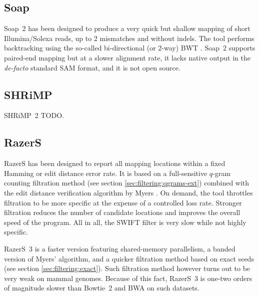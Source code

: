 
\subsection{Soap}
\label{background:mappers:soap}

Soap~2 \citep{Li2009b} has been designed to produce a very quick but shallow mapping of short Illumina/Solexa reads, up to 2 mismatches and without indels.
The tool performs backtracking using the so-called bi-directional (or 2-way) BWT \citep{Belazzougui2013}.
Soap~2 supports paired-end mapping but at a slower alignment rate, it lacks native output in the \emph{de-facto} standard SAM format, and it is not open source.


\subsection{SHRiMP}
\label{background:mappers:shrimp}

SHRiMP~2 TODO.


\subsection{RazerS}
\label{background:mappers:razers}

RazerS \citep{Weese2009} has been designed to report all mapping locations within a fixed Hamming or edit distance error rate.
It is based on a full-sensitive $q$-gram counting filtration method (see section \ref{sec:filtering:qgrams-ext}) combined with the edit distance verification algorithm by Myers \citep{Myers1999}.
On demand, the tool throttles filtration to be more specific at the expense of a controlled loss rate.
Stronger filtration reduces the number of candidate locations and improves the overall speed of the program.
All in all, the SWIFT filter is very slow while not highly specific.

RazerS~3 \citep{Weese2012} is a faster version featuring shared-memory parallelism, a banded version of Myers' algorithm, and a quicker filtration method based on exact seeds (see section \ref{sec:filtering:exact}).
Such filtration method however turns out to be very weak on mammal genomes.
Because of this fact, RazerS~3 is one-two orders of magnitude slower than Bowtie~2 and BWA on such datasets.

